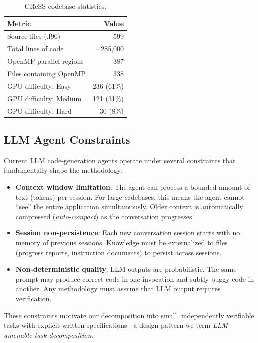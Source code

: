 \documentclass[conference]{IEEEtran}
\begin{document}
\begin{table}[t]
\centering
\caption{CReSS codebase statistics.}
\label{tab:cress_stats}
\begin{tabular}{lr}
\toprule
Metric & Value \\
\midrule
Source files (.f90) & 599 \\
Total lines of code & $\sim$285,000 \\
OpenMP parallel regions & 387 \\
Files containing OpenMP & 338 \\
GPU difficulty: Easy & 236 (61\%) \\
GPU difficulty: Medium & 121 (31\%) \\
GPU difficulty: Hard & 30 (8\%) \\
\bottomrule
\end{tabular}
\end{table}

\subsection{LLM Agent Constraints}

Current LLM code-generation agents operate under several constraints that
fundamentally shape the methodology:

\begin{itemize}
\item \textbf{Context window limitation}: The agent can process a bounded
  amount of text (tokens) per session. For large codebases, this means the
  agent cannot ``see'' the entire application simultaneously. Older context
  is automatically compressed (\emph{auto-compact}) as the conversation
  progresses.

\item \textbf{Session non-persistence}: Each new conversation session starts
  with no memory of previous sessions. Knowledge must be externalized to
  files (progress reports, instruction documents) to persist across sessions.

\item \textbf{Non-deterministic quality}: LLM outputs are probabilistic.
  The same prompt may produce correct code in one invocation and subtly
  buggy code in another. Any methodology must assume that LLM output
  requires verification.
\end{itemize}

These constraints motivate our decomposition into small, independently
verifiable tasks with explicit written specifications---a design pattern we
term \emph{LLM-amenable task decomposition}.
\end{document}
